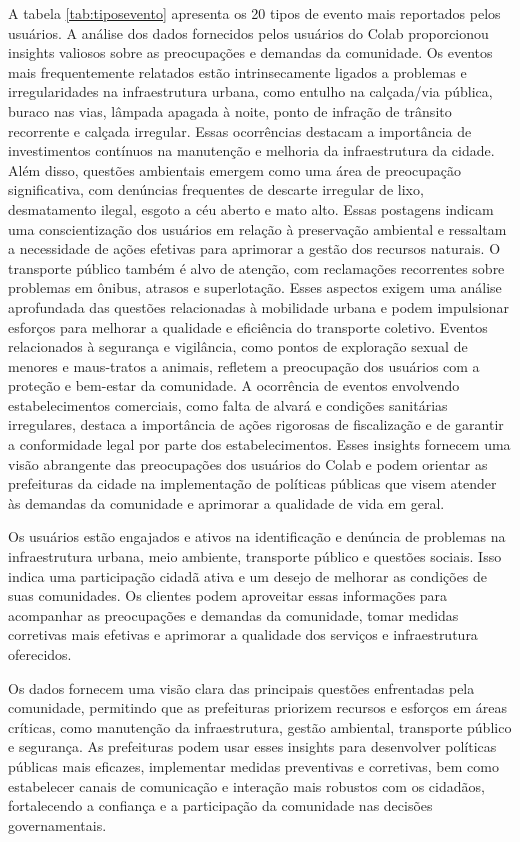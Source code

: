 A tabela \autoref{tab:tiposevento} apresenta os 20 tipos de evento mais reportados pelos usuários. A análise dos dados fornecidos pelos usuários do Colab proporcionou insights valiosos sobre as preocupações e demandas da comunidade. Os eventos mais frequentemente relatados estão intrinsecamente ligados a problemas e irregularidades na infraestrutura urbana, como entulho na calçada/via pública, buraco nas vias, lâmpada apagada à noite, ponto de infração de trânsito recorrente e calçada irregular. Essas ocorrências destacam a importância de investimentos contínuos na manutenção e melhoria da infraestrutura da cidade. Além disso, questões ambientais emergem como uma área de preocupação significativa, com denúncias frequentes de descarte irregular de lixo, desmatamento ilegal, esgoto a céu aberto e mato alto. Essas postagens indicam uma conscientização dos usuários em relação à preservação ambiental e ressaltam a necessidade de ações efetivas para aprimorar a gestão dos recursos naturais. O transporte público também é alvo de atenção, com reclamações recorrentes sobre problemas em ônibus, atrasos e superlotação. Esses aspectos exigem uma análise aprofundada das questões relacionadas à mobilidade urbana e podem impulsionar esforços para melhorar a qualidade e eficiência do transporte coletivo. Eventos relacionados à segurança e vigilância, como pontos de exploração sexual de menores e maus-tratos a animais, refletem a preocupação dos usuários com a proteção e bem-estar da comunidade. A ocorrência de eventos envolvendo estabelecimentos comerciais, como falta de alvará e condições sanitárias irregulares, destaca a importância de ações rigorosas de fiscalização e de garantir a conformidade legal por parte dos estabelecimentos. Esses insights fornecem uma visão abrangente das preocupações dos usuários do Colab e podem orientar as prefeituras da cidade na implementação de políticas públicas que visem atender às demandas da comunidade e aprimorar a qualidade de vida em geral.

Os usuários estão engajados e ativos na identificação e denúncia de problemas na infraestrutura urbana, meio ambiente, transporte público e questões sociais. Isso indica uma participação cidadã ativa e um desejo de melhorar as condições de suas comunidades. Os clientes podem aproveitar essas informações para acompanhar as preocupações e demandas da comunidade, tomar medidas corretivas mais efetivas e aprimorar a qualidade dos serviços e infraestrutura oferecidos.

Os dados fornecem uma visão clara das principais questões enfrentadas pela comunidade, permitindo que as prefeituras priorizem recursos e esforços em áreas críticas, como manutenção da infraestrutura, gestão ambiental, transporte público e segurança. As prefeituras podem usar esses insights para desenvolver políticas públicas mais eficazes, implementar medidas preventivas e corretivas, bem como estabelecer canais de comunicação e interação mais robustos com os cidadãos, fortalecendo a confiança e a participação da comunidade nas decisões governamentais.

